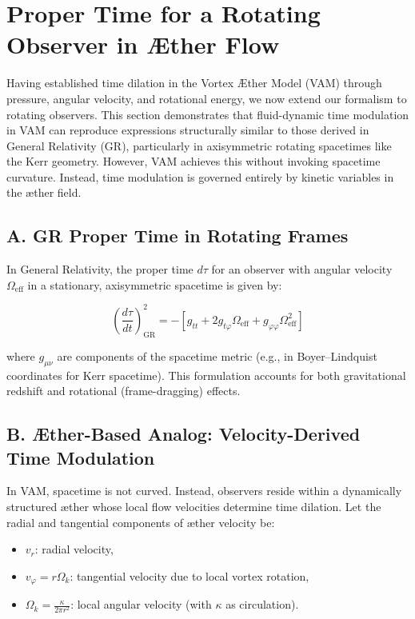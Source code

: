 \section{Proper Time for a Rotating Observer in Æther Flow}

Having established time dilation in the Vortex Æther Model (VAM) through pressure, angular velocity, and rotational energy, we now extend our formalism to rotating observers. This section demonstrates that fluid-dynamic time modulation in VAM can reproduce expressions structurally similar to those derived in General Relativity (GR), particularly in axisymmetric rotating spacetimes like the Kerr geometry. However, VAM achieves this without invoking spacetime curvature. Instead, time modulation is governed entirely by kinetic variables in the æther field.

\subsection*{A. GR Proper Time in Rotating Frames}

In General Relativity, the proper time \(d\tau\) for an observer with angular velocity \(\Omega_{\text{eff}}\) in a stationary, axisymmetric spacetime is given by:

\begin{equation}
\left( \frac{d\tau}{dt} \right)^2_{\text{GR}} = -\left[ g_{tt} + 2g_{t\varphi} \Omega_{\text{eff}} + g_{\varphi\varphi} \Omega_{\text{eff}}^2 \right]
\tag{18}
\end{equation}

where \(g_{\mu\nu}\) are components of the spacetime metric (e.g., in Boyer–Lindquist coordinates for Kerr spacetime). This formulation accounts for both gravitational redshift and rotational (frame-dragging) effects.

\subsection*{B. Æther-Based Analog: Velocity-Derived Time Modulation}

In VAM, spacetime is not curved. Instead, observers reside within a dynamically structured æther whose local flow velocities determine time dilation. Let the radial and tangential components of æther velocity be:

\begin{itemize}
\item \(v_r\): radial velocity,
\item \(v_\varphi = r\Omega_k\): tangential velocity due to local vortex rotation,
\item \(\Omega_k = \frac{\kappa}{2\pi r^2}\): local angular velocity (with \(\kappa\) as circulation).
\end{itemize}

